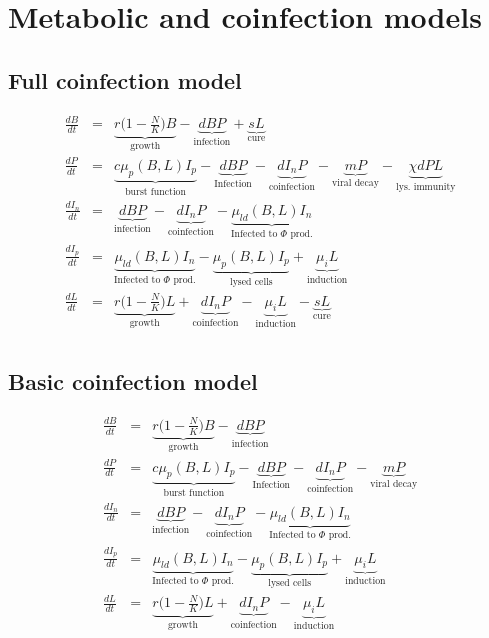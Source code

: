 \documentclass[10pt,a4paper,twoside,onecolumn, english]{report}
\begin{document}
\newcommand{\derivative}[1]{\frac{d #1}{dt}}


\section{Metabolic and coinfection models}

\subsection{Full coinfection model}
\begin{eqnarray*}
   \frac{dB}{dt}&=&\underbrace{r\big(1- \frac{N}{K}\big)B}_{\text{growth}} - \underbrace{dBP}_{\text{infection}} + \underbrace{sL}_{\text{cure}}\\
   \frac{dP}{dt}&=&\underbrace{c\mu_p(B,L)I_p}_{\text{burst function}} - \underbrace{dBP}_{\text{Infection}} - \underbrace{dI_nP}_{\text{coinfection}} - \underbrace{mP}_{\text{viral decay}} - \underbrace{\chi dPL}_{\text{lys. immunity}} \\
   \frac{dI_n}{dt}&=&\underbrace{dBP}_{\text{infection}} - \underbrace{dI_nP}_{\text{coinfection}} - \underbrace{\mu_{ld}(B,L)I_n}_{\text{Infected to $\Phi$ prod.}} \\
   \frac{dI_p}{dt}&=&\underbrace{\mu_{ld}(B,L)I_n}_{\text{Infected to $\Phi$ prod.}} - \underbrace{\mu_p(B,L)I_p}_{\text{lysed cells}} + \underbrace{\mu_i L}_{\text{induction}} \\
   \frac{dL}{dt}&=&\underbrace{r\big(1- \frac{N}{K}\big)L}_{\text{growth}} + \underbrace{dI_nP}_{\text{coinfection}} - \underbrace{\mu_i L}_{\text{induction}} - \underbrace{sL}_{\text{cure}} \\
\end{eqnarray*}

\subsection{Basic coinfection model}
\begin{eqnarray*}
   \frac{dB}{dt}&=&\underbrace{r\big(1- \frac{N}{K}\big)B}_{\text{growth}} - \underbrace{dBP}_{\text{infection}} \\
   \frac{dP}{dt}&=&\underbrace{c\mu_p(B,L)I_p}_{\text{burst function}} - \underbrace{dBP}_{\text{Infection}} - \underbrace{dI_nP}_{\text{coinfection}} - \underbrace{mP}_{\text{viral decay}} \\
   \frac{dI_n}{dt}&=&\underbrace{dBP}_{\text{infection}} - \underbrace{dI_nP}_{\text{coinfection}} - \underbrace{\mu_{ld}(B,L)I_n}_{\text{Infected to $\Phi$ prod.}} \\
   \frac{dI_p}{dt}&=&\underbrace{\mu_{ld}(B,L)I_n}_{\text{Infected to $\Phi$ prod.}} - \underbrace{\mu_p(B,L)I_p}_{\text{lysed cells}} + \underbrace{\mu_i L}_{\text{induction}} \\
   \frac{dL}{dt}&=&\underbrace{r\big(1- \frac{N}{K}\big)L}_{\text{growth}} + \underbrace{dI_nP}_{\text{coinfection}} - \underbrace{\mu_i L}_{\text{induction}} \\
\end{eqnarray*}
\end{document}
